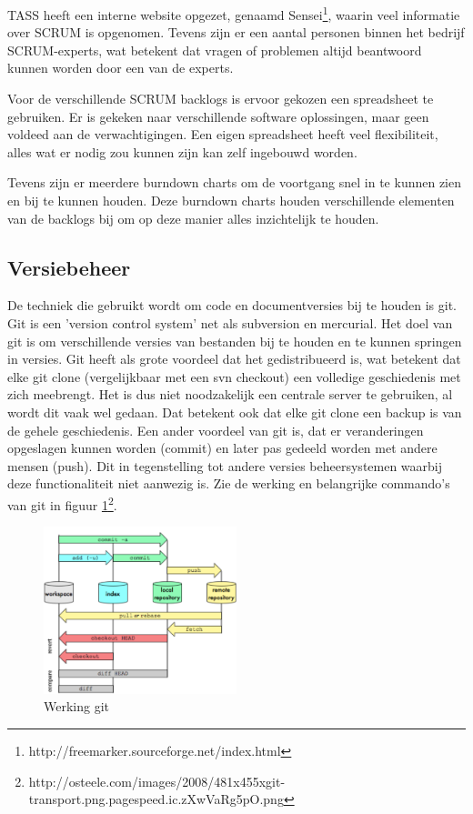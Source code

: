 \documentclass[]{article}
\begin{document}
TASS heeft een interne website opgezet, genaamd
Sensei\footnote{http://freemarker.sourceforge.net/index.html}, waarin
veel informatie over SCRUM is opgenomen. Tevens zijn er een
aantal personen binnen het bedrijf SCRUM-experts, wat betekent dat vragen of
problemen altijd beantwoord kunnen worden door een van de experts.

Voor de verschillende SCRUM backlogs is ervoor gekozen een spreadsheet te
gebruiken. Er is gekeken naar verschillende software oplossingen, maar geen
voldeed aan de verwachtigingen. Een eigen spreadsheet heeft veel
flexibiliteit, alles wat er nodig zou kunnen zijn kan zelf ingebouwd worden.

Tevens zijn er meerdere burndown charts om de voortgang snel in te kunnen
zien en bij te kunnen houden. Deze burndown charts houden verschillende
elementen van de backlogs bij om op deze manier alles inzichtelijk te
houden.

\subsection{Versiebeheer}

De techniek die gebruikt wordt om code en documentversies bij te houden is
git. Git is een 'version control system' net als subversion en
mercurial. Het doel van git is om verschillende versies van bestanden bij
te houden en te kunnen springen in versies. Git heeft als grote voordeel
dat het gedistribueerd is, wat betekent dat elke git clone (vergelijkbaar
met een svn checkout) een volledige geschiedenis met zich meebrengt. Het is
dus niet noodzakelijk een centrale server te gebruiken, al wordt dit vaak
wel gedaan. Dat betekent ook dat elke git clone een backup is van de gehele
geschiedenis. Een ander voordeel van git is, dat er veranderingen opgeslagen
kunnen worden (commit) en later pas gedeeld worden met andere mensen (push). Dit in
tegenstelling tot andere versies beheersystemen waarbij deze functionaliteit niet
aanwezig is. Zie de werking en belangrijke commando's van git in figuur
\ref{git}\footnote{http://osteele.com/images/2008/481x455xgit-transport.png.pagespeed.ic.zXwVaRg5pO.png}.

\begin{figure}[htpb]
  \begin{center}
    \includegraphics[width=0.50\textwidth]{git_diagram.pdf}
  \end{center}
  \caption{Werking git}
  \label{git}
\end{figure}
\end{document}
